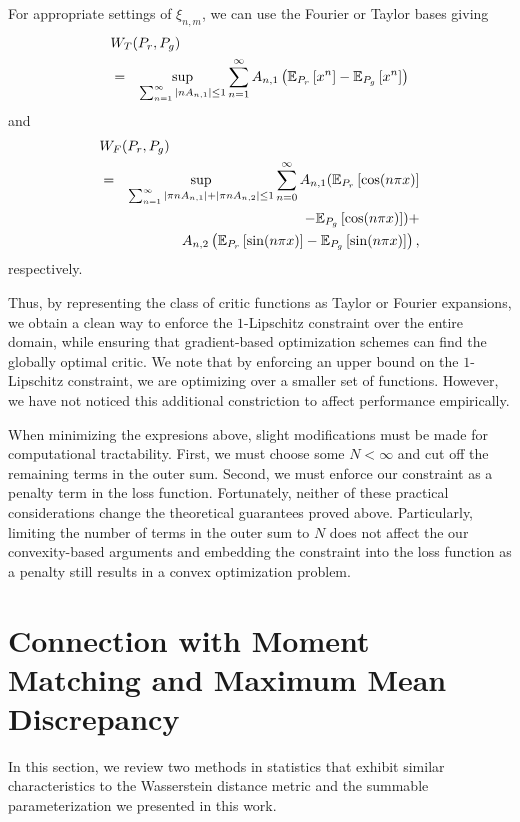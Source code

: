 \documentclass[letterpaper]{article} %
\begin{document}
For appropriate settings of $\xi_{n,m}$, we can use the Fourier or Taylor bases giving
\begin{eqnarray}
\lefteqn{W_T(P_r, P_g)}\\
&=& \underset{\sum_{n=1}^\infty |n A_{n,1}| \leq 1}{\sup} \sum_{n=1}^\infty A_{n,1}\left( \mathbb{E}_{P_r}\left[x^n\right] - \mathbb{E}_{P_g}\left[x^n\right]\right) \nonumber
\end{eqnarray}
and
\begin{eqnarray}
\lefteqn{W_F(P_r, P_g)}\\
&=& \underset{\sum_{n=1}^\infty |\pi n A_{n,1}| + |\pi n A_{n,2}| \leq 1}{\sup} \sum_{n=0}^\infty A_{n,1}( \mathbb{E}_{P_r}\left[\cos(n \pi x)\right]\nonumber\\
&&\;\;\;\;\;- \mathbb{E}_{P_g}\left[\cos(n \pi x) \right]) + \nonumber\\
&&\;\;A_{n,2} \left(\mathbb{E}_{P_r}\left[\sin(n \pi x)\right] - \mathbb{E}_{P_g}\left[\sin(n \pi x )\right] \right) \nonumber,
\end{eqnarray}
respectively.

Thus, by representing the class of critic functions as Taylor or Fourier expansions, we obtain a clean way to enforce the $1$-Lipschitz constraint over the entire domain, while ensuring that gradient-based optimization schemes can find the globally optimal critic. We note that by enforcing an upper bound on the $1$-Lipschitz constraint, we are optimizing over a smaller set of functions. However, we have not noticed this additional constriction to affect performance empirically.

When minimizing the expresions above, slight modifications must be made for computational tractability. First, we must choose some $N < \infty$ and cut off the remaining terms in the outer sum. Second, we must enforce our constraint as a penalty term in the loss function. Fortunately, neither of these practical considerations change the theoretical guarantees proved above. Particularly, limiting the number of terms in the outer sum to $N$ does not affect the our convexity-based arguments and embedding the constraint into the loss function as a penalty still results in a convex optimization problem.


\section{Connection with Moment Matching and Maximum Mean Discrepancy}

In this section, we review two methods in statistics that exhibit similar characteristics
to the Wasserstein distance metric and the summable parameterization we presented in this work.
\end{document}
